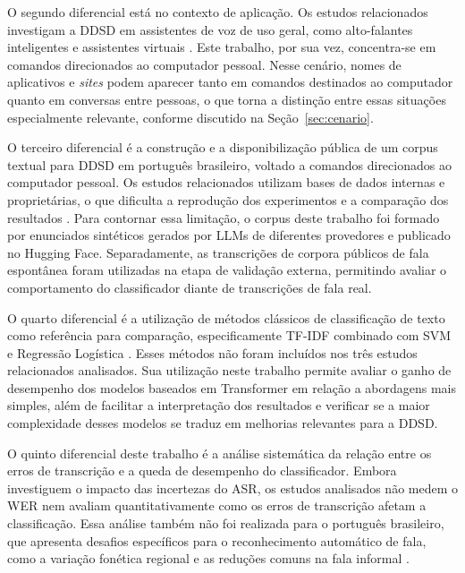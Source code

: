 \documentclass[
    12pt,                %
    openright,           %
    oneside,             %
    a4paper,             %
    english,             %
    brazil               %
]{abntex2}
\begin{document}
O segundo diferencial está no contexto de aplicação. Os estudos relacionados investigam a DDSD em assistentes de voz de uso geral, como alto-falantes inteligentes e assistentes virtuais \cite{Mallidi2018, Wagner2024, Dighe2024}. Este trabalho, por sua vez, concentra-se em comandos direcionados ao computador pessoal. Nesse cenário, nomes de aplicativos e \textit{sites} podem aparecer tanto em comandos destinados ao computador quanto em conversas entre pessoas, o que torna a distinção entre essas situações especialmente relevante, conforme discutido na Seção~\ref{sec:cenario}.

O terceiro diferencial é a construção e a disponibilização pública de um corpus textual para DDSD em português brasileiro, voltado a comandos direcionados ao computador pessoal. Os estudos relacionados utilizam bases de dados internas e proprietárias, o que dificulta a reprodução dos experimentos e a comparação dos resultados \cite{Wazlawick2020}. Para contornar essa limitação, o corpus deste trabalho foi formado por enunciados sintéticos gerados por LLMs de diferentes provedores \cite{Moller2024} e publicado no Hugging Face. Separadamente, as transcrições de corpora públicos de fala espontânea \cite{CORAA2023, NURCSP2025, Tagarela2026} foram utilizadas na etapa de validação externa, permitindo avaliar o comportamento do classificador diante de transcrições de fala real.

O quarto diferencial é a utilização de métodos clássicos de classificação de texto como referência para comparação, especificamente TF-IDF combinado com SVM e Regressão Logística \cite{Manning2008}. Esses métodos não foram incluídos nos três estudos relacionados analisados. Sua utilização neste trabalho permite avaliar o ganho de desempenho dos modelos baseados em Transformer em relação a abordagens mais simples, além de facilitar a interpretação dos resultados e verificar se a maior complexidade desses modelos se traduz em melhorias relevantes para a DDSD.

O quinto diferencial deste trabalho é a análise sistemática da relação entre os erros de transcrição e a queda de desempenho do classificador. Embora  investiguem o impacto das incertezas do ASR, os estudos analisados não medem o WER nem avaliam quantitativamente como os erros de transcrição afetam a classificação. Essa análise também não foi realizada para o português brasileiro, que apresenta desafios específicos para o reconhecimento automático de fala, como a variação fonética regional e as reduções comuns na fala informal \cite{CORAA2023}.
\end{document}
